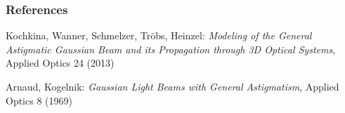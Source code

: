 \documentclass{beamer}
\begin{document}
\begin{frame}

\frametitle{References}

\begin{thebibliography}{99} 

Kochkina, Wanner, Schmelzer, Tr\"obs, Heinzel:
\textit{Modeling of the General Astigmatic Gaussian Beam and its Propagation through 3D Optical Systems},
Applied Optics 24 (2013)

Arnaud, Kogelnik:
\textit{Gaussian Light Beams with General Astigmatism},
Applied Optics 8 (1969)

\end{thebibliography}

\end{frame}
\end{document}
